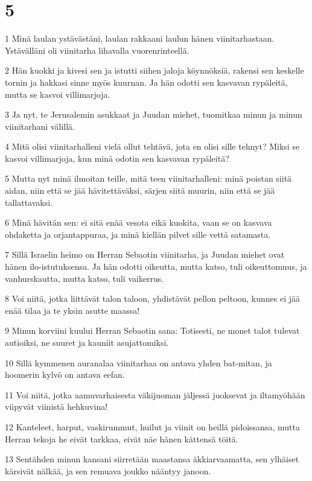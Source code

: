 \chapter{5}

\par 1 Minä laulan ystävästäni, laulan rakkaani laulun hänen viinitarhastaan. Ystävälläni oli viinitarha lihavalla vuorenrinteellä.
\par 2 Hän kuokki ja kivesi sen ja istutti siihen jaloja köynnöksiä, rakensi sen keskelle tornin ja hakkasi sinne myös kuurnan. Ja hän odotti sen kasvavan rypäleitä, mutta se kasvoi villimarjoja.
\par 3 Ja nyt, te Jerusalemin asukkaat ja Juudan miehet, tuomitkaa minun ja minun viinitarhani välillä.
\par 4 Mitä olisi viinitarhalleni vielä ollut tehtävä, jota en olisi sille tehnyt? Miksi se kasvoi villimarjoja, kun minä odotin sen kasvavan rypäleitä?
\par 5 Mutta nyt minä ilmoitan teille, mitä teen viinitarhalleni: minä poistan siitä aidan, niin että se jää hävitettäväksi, särjen siitä muurin, niin että se jää tallattavaksi.
\par 6 Minä hävitän sen: ei sitä enää vesota eikä kuokita, vaan se on kasvava ohdaketta ja orjantappuraa, ja minä kiellän pilvet sille vettä satamasta.
\par 7 Sillä Israelin heimo on Herran Sebaotin viinitarha, ja Juudan miehet ovat hänen ilo-istutuksensa. Ja hän odotti oikeutta, mutta katso, tuli oikeuttomuus, ja vanhurskautta, mutta katso, tuli vaikerrus.
\par 8 Voi niitä, jotka liittävät talon taloon, yhdistävät pellon peltoon, kunnes ei jää enää tilaa ja te yksin asutte maassa!
\par 9 Minun korviini kuului Herran Sebaotin sana: Totisesti, ne monet talot tulevat autioiksi, ne suuret ja kauniit asujattomiksi.
\par 10 Sillä kymmenen auranalaa viinitarhaa on antava yhden bat-mitan, ja hoomerin kylvö on antava eefan.
\par 11 Voi niitä, jotka aamuvarhaisesta väkijuoman jäljessä juoksevat ja iltamyöhään viipyvät viinistä hehkuvina!
\par 12 Kanteleet, harput, vaskirummut, huilut ja viinit on heillä pidoissansa, mutta Herran tekoja he eivät tarkkaa, eivät näe hänen kättensä töitä.
\par 13 Sentähden minun kansani siirretään maastansa äkkiarvaamatta, sen ylhäiset kärsivät nälkää, ja sen remuava joukko nääntyy janoon.
